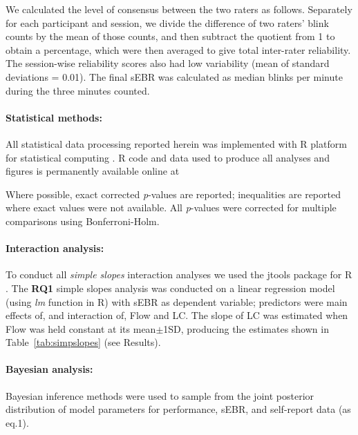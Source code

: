 \documentclass[10pt,letterpaper,floatsintext]{article}
\begin{document}
We calculated the level of consensus between the two raters as follows. Separately for each participant and session, we divide the difference of two raters' blink counts by the mean of those counts, and then subtract the quotient from 1 to obtain a percentage, which were then averaged to give total inter-rater reliability. The session-wise reliability scores also had low variability (mean of standard deviations = 0.01). The final sEBR was calculated as median blinks per minute during the three minutes counted.

\paragraph{Statistical methods:}
All statistical data processing reported herein was implemented with {\sf R} platform for statistical computing \cite{R2014}. {\sf R} code and data used to produce all analyses and figures is permanently available online at %

Where possible, exact corrected {\it p}-values are reported; inequalities are reported where exact values were not available.
All {\it p}-values were corrected for multiple comparisons using Bonferroni-Holm.


\paragraph{Interaction analysis:}
To conduct all {\it simple slopes} interaction analyses we used the {\sf jtools} package for {\sf R} \cite{jtools}. The {\bf RQ1} simple slopes analysis was conducted on a linear regression model (using {\it lm} function in {\sf R}) with sEBR as dependent variable; predictors were main effects of, and interaction of, Flow and LC. The slope of LC was estimated when Flow was held constant at its mean$\pm$1SD, producing the estimates shown in Table~\ref{tab:simpslopes} (see Results).

\paragraph{Bayesian analysis:}
Bayesian inference methods were used to sample from the joint posterior distribution of model parameters for performance, sEBR, and self-report data (as eq.1).
\end{document}
